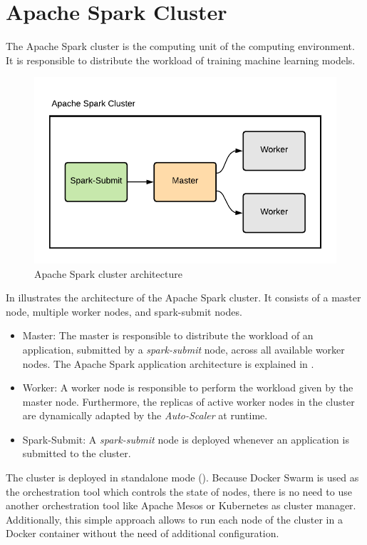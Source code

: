 \section{Apache Spark Cluster}
\label{sec:05_spark}
The Apache Spark cluster is the computing unit of the computing environment. It is responsible to distribute the workload of training machine learning models.
\begin{figure}[h]
\centering
\includegraphics[scale=1]{images/05_conceptual_design/apache_spark/apache_spark_cluster}
\caption{Apache Spark cluster architecture}
\label{fig:05_spark_arch}
\end{figure}
In  illustrates the architecture of the Apache Spark cluster. It consists of a master node, multiple worker nodes, and spark-submit nodes.

\begin{itemize}
\item Master: The master is responsible to distribute the workload of an application, submitted by a \textit{spark-submit} node, across all available worker nodes. The Apache Spark application architecture is explained in .

\item Worker: A worker node is responsible to perform the workload given by the master node. Furthermore, the replicas of active worker nodes in the cluster are dynamically adapted by the \textit{Auto-Scaler} at runtime.

\item Spark-Submit: A \textit{spark-submit} node is deployed whenever an application is submitted to the cluster.
\end{itemize}
The cluster is deployed in standalone mode (). Because Docker Swarm is used as the orchestration tool which controls the state of nodes, there is no need to use another orchestration tool like Apache Mesos or Kubernetes as cluster manager.
Additionally, this simple approach allows to run each node of the cluster in a Docker container without the need of additional configuration.


